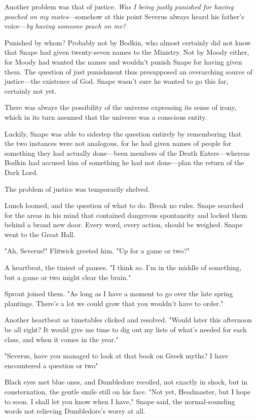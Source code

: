 Another problem was that of justice. \emph{Was I being justly punished for having peached on my mates}—somehow at this point Severus always heard his father's voice—\emph{by having someone peach on me?}

Punished by whom? Probably not by Bodkin, who almost certainly did not know that Snape had given twenty-seven names to the Ministry. Not by Moody either, for Moody had wanted the names and wouldn't punish Snape for having given them. The question of just punishment thus presupposed an overarching source of justice—the existence of God. Snape wasn't sure he wanted to go this far, certainly not yet.

There was always the possibility of the universe expressing its sense of irony, which in its turn assumed that the universe was a conscious entity.

Luckily, Snape was able to sidestep the question entirely by remembering that the two instances were not analogous, for he had given names of people for something they had actually done—been members of the Death Eaters—whereas Bodkin had accused him of something he had not done—plan the return of the Dark Lord.

The problem of justice was temporarily shelved.

Lunch loomed, and the question of what to do. Break no rules. Snape searched for the areas in his mind that contained dangerous spontaneity and locked them behind a brand new door. Every word, every action, should be weighed. Snape went to the Great Hall.

"Ah, Severus!" Flitwick greeted him. "Up for a game or two?"

A heartbeat, the tiniest of pauses. "I think so. I'm in the middle of something, but a game or two might clear the brain."

Sprout joined them. "As long as I have a moment to go over the late spring plantings. There's a lot we could grow that you wouldn't have to order."

Another heartbeat as timetables clicked and resolved. "Would later this afternoon be all right? It would give me time to dig out my lists of what's needed for each class, and when it comes in the year."

"Severus, have you managed to look at that book on Greek myths? I have encountered a question or two{\el}"

Black eyes met blue ones, and Dumbledore recoiled, not exactly in shock, but in consternation, the gentle smile still on his face. "Not yet, Headmaster, but I hope to soon. I shall let you know when I have," Snape said, the normal-sounding words not relieving Dumbledore's worry at all.

